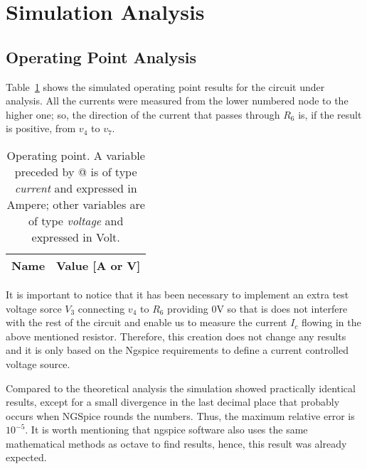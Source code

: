 \section{Simulation Analysis }
\label{sec:simulation}

\subsection{Operating Point Analysis}

Table~\ref{tab:op} shows the simulated operating point results for the circuit under analysis. All the currents were measured from the lower numbered node to the higher one; so, the direction of the current that passes through $R_6$ is, if the result is positive, from $v_4$ to $v_7$.

\begin{table}[h]
  \centering
  \begin{tabular}{|l|r|}
    \hline    
    {\bf Name} & {\bf Value [A or V]} \\ \hline
    
  \end{tabular}
  \caption{Operating point. A variable preceded by @ is of type {\em current}
    and expressed in Ampere; other variables are of type {\it voltage} and expressed in
    Volt.}
  \label{tab:op}
\end{table}

It is important to notice that it has been necessary to implement an extra test voltage sorce $V_3$ connecting $v_4$ to $R_6$ providing 0V so that is does not interfere with the rest of the circuit and enable us to measure the current $I_c$ flowing in the above mentioned resistor. Therefore, this creation does not change any results and it is only based on the Ngspice requirements to define a current controlled voltage source.

Compared to the theoretical analysis the simulation showed practically identical results, except for a small divergence in the last decimal place that probably occurs when NGSpice rounds the numbers. Thus, the maximum relative error is $10^{-5}$.
It is worth mentioning that ngspice software also uses the same mathematical methods as octave to find results, hence, this result was already expected.









